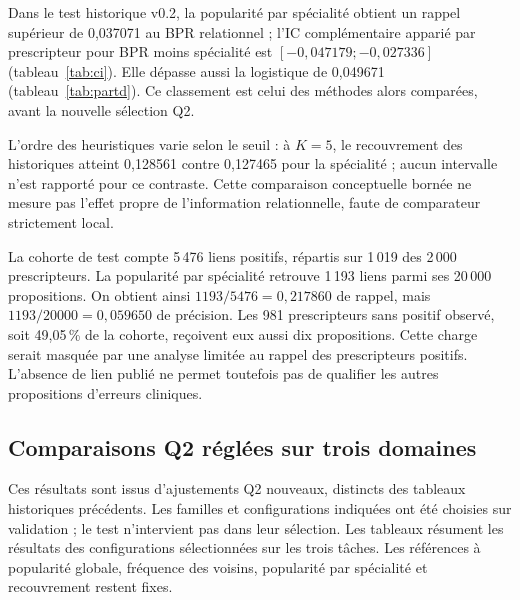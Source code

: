 Dans le test historique v0.2, la popularité par spécialité obtient un rappel supérieur de 0,037071 au BPR relationnel ; l'IC complémentaire apparié par prescripteur pour BPR moins spécialité est $[-0,047179;-0,027336]$ (tableau~\ref{tab:ci}). Elle dépasse aussi la logistique de 0,049671 (tableau~\ref{tab:partd}). Ce classement est celui des méthodes alors comparées, avant la nouvelle sélection Q2.

L'ordre des heuristiques varie selon le seuil : à $K=5$, le recouvrement des historiques atteint 0,128561 contre 0,127465 pour la spécialité ; aucun intervalle n'est rapporté pour ce contraste. Cette comparaison conceptuelle bornée ne mesure pas l'effet propre de l'information relationnelle, faute de comparateur strictement local.

La cohorte de test compte 5\,476 liens positifs, répartis sur 1\,019 des 2\,000 prescripteurs. La popularité par spécialité retrouve 1\,193 liens parmi ses 20\,000 propositions. On obtient ainsi $1193/5476=0,217860$ de rappel, mais $1193/20000=0,059650$ de précision. Les 981 prescripteurs sans positif observé, soit 49,05\,\% de la cohorte, reçoivent eux aussi dix propositions\cite{hgbpartd}. Cette charge serait masquée par une analyse limitée au rappel des prescripteurs positifs. L'absence de lien publié ne permet toutefois pas de qualifier les autres propositions d'erreurs cliniques.


\subsection{Comparaisons Q2 réglées sur trois domaines}
\label{sec:q2-results}

Ces résultats sont issus d'ajustements Q2 nouveaux, distincts des tableaux historiques précédents. Les familles et configurations indiquées ont été choisies sur validation ; le test n'intervient pas dans leur sélection. Les tableaux résument les résultats des configurations sélectionnées sur les trois tâches\cite{hgbq2methods}. Les références à popularité globale, fréquence des voisins, popularité par spécialité et recouvrement restent fixes.

\begin{table}[!htbp]
\centering\small
\caption{Comparaison Q2 sur MAUDE : configurations des six familles réglables sélectionnées sur la validation 2023, puis rappel micro@10 moyen sur les tests 2024 et 2025. Les deux heuristiques fixes n'ont pas de sélection et leurs valeurs de validation ne sont pas rapportées ici. Lorsque trois répétitions sont requises, la valeur de test est leur moyenne avec les graines 103, 211 et 307 ; aucune graine n'est sélectionnée. Aucun nouvel intervalle n'est associé aux résultats.}
\label{tab:q2-maude}

\end{table}

